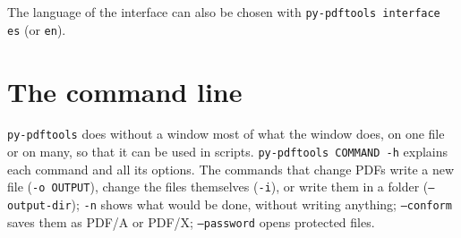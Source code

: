 \documentclass[12pt,
              article,
              oneside
              ]{memoir}
\begin{document}
%
The language of the interface can also be chosen with
\texttt{py-pdftools interface es} (or \texttt{en}).

\section{The command line}
\label{sec:cli}

%
\texttt{py-pdftools} does without a window most of what the window does,
on one file or on many, so that it can be used in scripts.
\texttt{py-pdftools COMMAND -h} explains each command and all its options.
The commands that change PDFs write a new file
(\texttt{-o OUTPUT}), change the files themselves (\texttt{-i}), or write
them in a folder (\texttt{--output-dir}); \texttt{-n} shows what would be
done, without writing anything; \texttt{--conform} saves them as PDF/A or
PDF/X; \texttt{--password} opens protected files.
\end{document}
